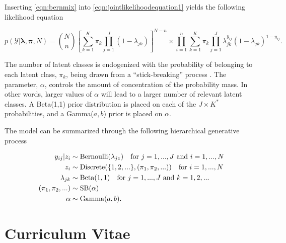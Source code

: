\documentclass[
  12pt,
]{article}
\begin{document}
Inserting \autoref{eqn:bernmix} into
\autoref{eqn:jointlikelihoodequation1} yields the following likelihood
equation

\begin{equation}
\label{eqn:LCMCRlikelihood}
p(\mathcal{Y}|\boldsymbol{\lambda},\boldsymbol{\pi},N)=\binom{N}{n} \left[ \sum_{k=1}^K \pi_k \prod_{j=1}^J (1-\lambda_{jk}) \right]^{N-n} \times \prod_{i=1}^n \sum_{k=1}^K \pi_k \prod_{j=1}^J \lambda_{jk}^{y_{ij}}(1-\lambda_{jk})^{1-y_{ij}}.
\end{equation}

The number of latent classes is endogenized with the probability of
belonging to each latent class, \(\pi_k\), being drawn from a
``stick-breaking'' process \citep{sethuraman_constructive_1991}. The
parameter, \(\alpha\), controls the amount of concentration of the
probability mass. In other words, larger values of \(\alpha\) will lead
to a larger number of relevant latent classes. A Beta(1,1) prior
distribution is placed on each of the \(J \times K^*\) probabilities,
and a Gamma(\(a,b\)) prior is placed on \(\alpha\).

The model can be summarized through the following hierarchical
generative process

\begin{align} 
\nonumber y_{ij}|z_i & \sim \text{Bernoulli}(\lambda_{jz}) \hspace{10px} \text{for } j=1,...,J \text{ and } i=1,...,N\\  \nonumber
z_i & \sim \text{Discrete}(\{1,2,...\},(\pi_1,\pi_2,...)) \hspace{10px} \text{for } i=1,...,N \\ \nonumber
\lambda_{jk} & \sim \text{Beta}(1,1) \hspace{10px} \text{for } j=1,...,J \text{ and } k=1,2,... \\ \nonumber
(\pi_1,\pi_2,...) & \sim \text{SB}(\alpha) \\ 
\alpha & \sim \text{Gamma}(a,b).
\end{align}

\newpage

\renewcommand{\bibname}{References}


\newpage

\pagestyle{empty}
\section*{Curriculum Vitae}\label{curriculumvitae}
\end{document}
